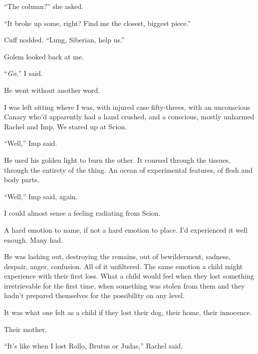 ``The column?'' she asked.



``It broke up some, right?  Find me the closest, biggest piece.''



Cuff nodded.  ``Lung, Siberian, help us.''



Golem looked back at me.



``\emph{Go},'' I said.



He went without another word.



I was left sitting where I was, with injured case fifty-threes, with an unconscious Canary who'd apparently had a hand crushed, and a conscious, mostly unharmed Rachel and Imp.  We stared up at Scion.



``Well,'' Imp said.



He used his golden light to burn the other.  It coursed through the tissues, through the entirety of the thing.  An ocean of experimental features, of flesh and body parts.



``Well,'' Imp said, again.



I could almost sense a feeling radiating from Scion.



A hard emotion to name, if not a hard emotion to place.  I'd experienced it well enough.  Many had.



He was lashing out, destroying the remains, out of bewilderment, sadness, despair, anger, confusion.  All of it unfiltered.  The same emotion a child might experience with their first loss.  What a child would feel when they lost something irretrievable for the first time, when something was stolen from them and they hadn't prepared themselves for the possibility on any level.



It was what one felt as a child if they lost their dog, their home, their innocence.



Their mother.



``It's like when I lost Rollo, Brutus or Judas,'' Rachel said.



